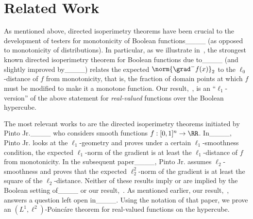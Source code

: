\section{Related Work}
\label{sec:related}

As mentioned above, directed isoperimetry theorems have been  crucial to the development of testers for monotonicity of Boolean functions____ (as opposed to monotonicity of distributions). In particular, as we illustrate in~, the strongest known directed isoperimetry theorem for Boolean functions due to____ (and slightly improved by____) relates the expected $\norm{\grad^-f(x)}_2$ to the $\ell_0$-distance of $f$ from monotonicity, that is, the fraction of domain points at which $f$ must be modified to make it a monotone function. Our result,~, is an ``$\ell_1$-version'' of the above statement for {\em real-valued} functions over the Boolean hypercube. 

The most relevant works to  are the directed isoperimetry theorems initiated by Pinto Jr.____ who considers smooth functions $f:[0,1]^n \to \RR$. In____, Pinto Jr. looks at the $\ell_1$-geometry and proves under a certain $\ell_1$-smoothness condition, the expected $\ell_1$-norm of the gradient is at least the $\ell_1$-distance of $f$ from monotonicity. In the subsequent paper____, Pinto Jr. assumes $\ell_2$-smoothness and proves that the expected $\ell_2^2$-norm of the gradient is at least the square of the $\ell_2$-distance. Neither of these results imply or are implied by the Boolean setting of____ or our result,~. As mentioned earlier, our result,~, answers a question left open in____.
Using the notation of that paper, we prove an $(L^1, \ell^2)$-Poinc\'{a}re theorem
for real-valued functions on the hypercube.


